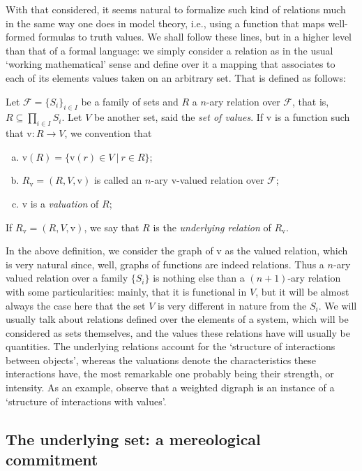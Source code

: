 With that considered, it seems natural to formalize such kind of relations much in the same way one does in model theory, i.e., using a function that maps well-formed formulas to truth values. We shall follow these lines, but in a higher level than that of a formal language: we simply consider a relation as in the usual `working mathematical' sense and define over it a mapping that associates to each of its elements values taken on an arbitrary set. That is defined as follows:

\begin{definition} \label{def::valued_relation}
Let $\mathcal{F} = \{S_i\}_{i\in I}$ be a family of sets and $R$ a $n$-ary relation over $\mathcal{F}$, that is, $R \subseteq \prod_{i \in I} S_i$. Let $V$ be another set, said the \textit{set of values}. If $\mathrm{v}$ is a function such that $\mathrm{v}: R \rightarrow V$, we convention that 
\begin{enumerate}[(a)]
\item $\mathrm{v}(R) = \{\mathrm{v}(r) \in V\ |\ r \in R\}$;
\item $R_\mathrm{v} = (R, V, \mathrm{v})$ is called an $n$-ary $\mathrm{v}$-valued relation over $\mathcal{F}$;
\item $\mathrm{v}$ is a \textit{valuation} of $R$;
\end{enumerate}
If $R_\mathrm{v} = (R, V, \mathrm{v})$, we say that $R$ is the \textit{underlying relation} of $R_\mathrm{v}$.
\end{definition}

In the above definition, we consider the graph of $\mathrm{v}$ as the valued relation, which is very natural since, well, graphs of functions are indeed relations. Thus a $n$-ary valued relation over a family $\{S_i\}$ is nothing else than a $(n+1)$-ary relation with some particularities: mainly, that it is functional in $V$, but it will be almost always the case here that the set $V$ is very different in nature from the $S_i$. We will usually talk about relations defined over the elements of a system, which will be considered as sets themselves, and the values these relations have will usually be quantities. The underlying relations account for the `structure of interactions between objects', whereas the valuations denote the characteristics these interactions have, the most remarkable one probably being their strength, or intensity. As an example, observe that a weighted digraph is an instance of a `structure of interactions with values'.

\subsection{The underlying set: a mereological commitment}

